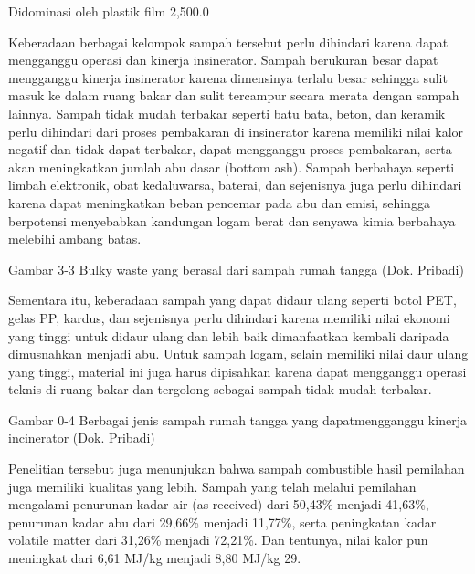 \documentclass[
  letterpaper,
  DIV=11,
  numbers=noendperiod]{scrreprt}
\begin{document}
Didominasi oleh plastik film 2,500.0

Keberadaan berbagai kelompok sampah tersebut perlu dihindari karena
dapat mengganggu operasi dan kinerja insinerator. Sampah berukuran besar
dapat mengganggu kinerja insinerator karena dimensinya terlalu besar
sehingga sulit masuk ke dalam ruang bakar dan sulit tercampur secara
merata dengan sampah lainnya. Sampah tidak mudah terbakar seperti batu
bata, beton, dan keramik perlu dihindari dari proses pembakaran di
insinerator karena memiliki nilai kalor negatif dan tidak dapat
terbakar, dapat mengganggu proses pembakaran, serta akan meningkatkan
jumlah abu dasar (bottom ash). Sampah berbahaya seperti limbah
elektronik, obat kedaluwarsa, baterai, dan sejenisnya juga perlu
dihindari karena dapat meningkatkan beban pencemar pada abu dan emisi,
sehingga berpotensi menyebabkan kandungan logam berat dan senyawa kimia
berbahaya melebihi ambang batas.

Gambar 3-3 Bulky waste yang berasal dari sampah rumah tangga (Dok.
Pribadi)

Sementara itu, keberadaan sampah yang dapat didaur ulang seperti botol
PET, gelas PP, kardus, dan sejenisnya perlu dihindari karena memiliki
nilai ekonomi yang tinggi untuk didaur ulang dan lebih baik dimanfaatkan
kembali daripada dimusnahkan menjadi abu. Untuk sampah logam, selain
memiliki nilai daur ulang yang tinggi, material ini juga harus
dipisahkan karena dapat mengganggu operasi teknis di ruang bakar dan
tergolong sebagai sampah tidak mudah terbakar.

Gambar 0-4 Berbagai jenis sampah rumah tangga yang dapatmengganggu
kinerja incinerator (Dok. Pribadi)

Penelitian tersebut juga menunjukan bahwa sampah combustible hasil
pemilahan juga memiliki kualitas yang lebih. Sampah yang telah melalui
pemilahan mengalami penurunan kadar air (as received) dari 50,43\%
menjadi 41,63\%, penurunan kadar abu dari 29,66\% menjadi 11,77\%, serta
peningkatan kadar volatile matter dari 31,26\% menjadi 72,21\%. Dan
tentunya, nilai kalor pun meningkat dari 6,61 MJ/kg menjadi 8,80 MJ/kg
29.
\end{document}
